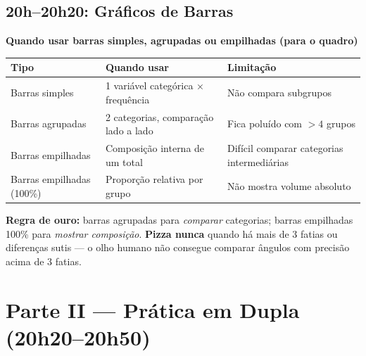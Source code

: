 \subsection{20h–20h20: Gráficos de Barras}

\begin{BoardBox}
\textbf{Quando usar barras simples, agrupadas ou empilhadas (para o quadro)}

\begin{tabular}{|l|p{5cm}|p{5.5cm}|}
\hline
\textbf{Tipo} & \textbf{Quando usar} & \textbf{Limitação} \\
\hline
Barras simples & 1 variável categórica × frequência & Não compara subgrupos \\
Barras agrupadas & 2 categorias, comparação lado a lado & Fica poluído com $>4$ grupos \\
Barras empilhadas & Composição interna de um total & Difícil comparar categorias intermediárias \\
Barras empilhadas (100\%) & Proporção relativa por grupo & Não mostra volume absoluto \\
\hline
\end{tabular}

\textbf{Regra de ouro:} barras agrupadas para \emph{comparar} categorias;
barras empilhadas 100\% para \emph{mostrar composição}.
\textbf{Pizza nunca} quando há mais de 3 fatias ou diferenças sutis — o olho humano
não consegue comparar ângulos com precisão acima de 3 fatias.
\end{BoardBox}

\section{Parte II — Prática em Dupla (20h20–20h50)}

